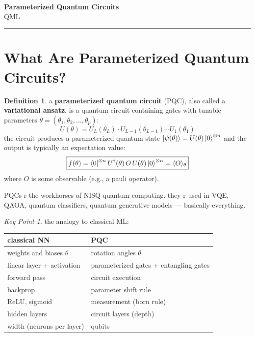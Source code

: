 \documentclass[11pt,a4paper]{article}
\theoremstyle{definition}
\newtheorem{definition}{Definition}[section]
\theoremstyle{remark}
\newtheorem*{keypoint}{Key Point}
\begin{document}
\begin{center}
    {\LARGE \textbf{Parameterized Quantum Circuits}}\\[8pt]
    {\large QML}\\[12pt]
    \hrule
\end{center}

\vspace{12pt}
\tableofcontents
\newpage

\section{What Are Parameterized Quantum Circuits?}

\begin{definition}
a \textbf{parameterized quantum circuit} (PQC), also called a \textbf{variational ansatz}, is a quantum circuit containing gates with tunable parameters $\theta = (\theta_1, \theta_2, \ldots, \theta_p)$:
\[
U(\theta) = U_L(\theta_L) \cdot U_{L-1}(\theta_{L-1}) \cdots U_1(\theta_1)
\]
the circuit produces a parameterized quantum state $\ket{\psi(\theta)} = U(\theta)\ket{0}^{\otimes n}$ and the output is typically an expectation value:
\[
\boxed{f(\theta) = \bra{0}^{\otimes n} U^\dagger(\theta) \, O \, U(\theta) \ket{0}^{\otimes n} = \langle O \rangle_\theta}
\]
where $O$ is some observable (e.g., a pauli operator).
\end{definition}

PQCs r the workhorses of NISQ quantum computing. they r used in VQE, QAOA, quantum classifiers, quantum generative models --- basically everything.

\begin{keypoint}
the analogy to classical ML:
\begin{center}
\begin{tabular}{l|l}
\textbf{classical NN} & \textbf{PQC} \\
\hline
weights and biases $\theta$ & rotation angles $\theta$ \\
linear layer + activation & parameterized gates + entangling gates \\
forward pass & circuit execution \\
backprop & parameter shift rule \\
ReLU, sigmoid & measurement (born rule) \\
hidden layers & circuit layers (depth) \\
width (neurons per layer) & qubits
\end{tabular}
\end{center}
\end{keypoint}
\end{document}
